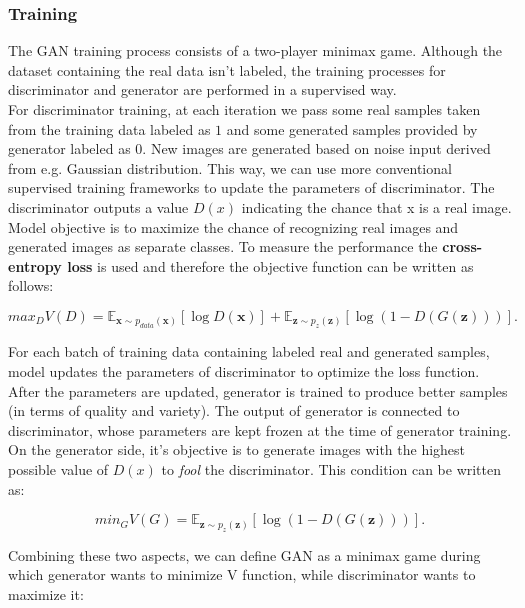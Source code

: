 \documentclass[12pt,a4paper,openany]{book}
\begin{document}
\subsubsection{Training}
\noindent The GAN training process consists of a two-player minimax game. Although the dataset containing the real data isn’t labeled, the training processes for discriminator and generator are performed in a supervised way.  \\
\noindent For discriminator training, at each iteration we pass some real samples taken from the training data labeled as $1$ and some generated samples provided by generator labeled as $0$. New images are generated based on noise input derived from e.g. Gaussian distribution. This way, we can use more conventional supervised training frameworks to update the parameters of discriminator. The discriminator outputs a value $D(x)$ indicating the chance that x is a real image. Model objective is to maximize the chance of recognizing real images and generated images as separate classes. To measure the performance the \textbf{cross-entropy loss} is used and therefore the objective function can be written as follows:

\begin{equation}
max_{D} V(D) = \mathbb{E}_{\textbf{x} \sim p_{data}(\textbf{x})} [\log D(\textbf{x})] + \mathbb{E}_{\textbf{z} \sim p_{z}(\textbf{z})} [\log(1-D(G(\textbf{z})))].
\end{equation}

\noindent For each batch of training data containing labeled real and generated samples, model updates the parameters of discriminator to optimize the loss function. After the parameters are updated, generator is trained to produce better samples (in terms of quality and variety). The output of generator is connected to discriminator, whose parameters are kept frozen at the time of generator training. On the generator side, it's objective is to generate images with the highest possible value of $D(x)$ to \textit{fool} the discriminator. This condition can be written as:

\begin{equation}
min_{G} V(G) = \mathbb{E}_{\textbf{z} \sim p_{z}(\textbf{z})} [\log(1-D(G(\textbf{z})))].
\end{equation}

\noindent Combining these two aspects, we can define GAN as a minimax game during which generator wants to minimize V function, while discriminator wants to maximize it:
\end{document}
